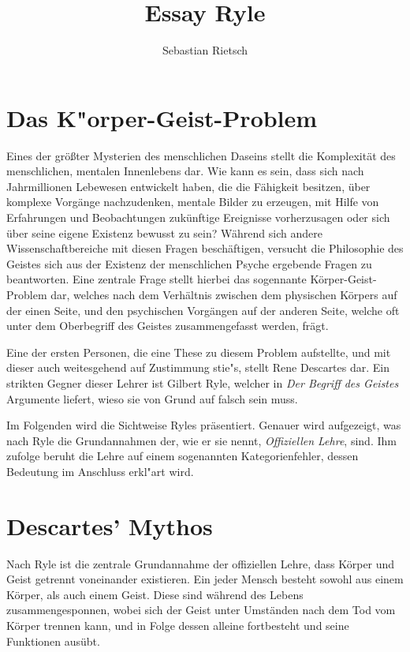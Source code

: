 \documentclass[a4paper]{article}
\title{Essay Ryle}
\date{}
\author{Sebastian Rietsch}
\begin{document}
\maketitle
\section{Das K"orper-Geist-Problem}
Eines der größter Mysterien des menschlichen Daseins stellt die Komplexität des menschlichen, mentalen Innenlebens dar. Wie kann es sein, dass sich nach Jahrmillionen Lebewesen entwickelt haben, die die Fähigkeit besitzen, über komplexe Vorgänge nachzudenken, mentale Bilder zu erzeugen, mit Hilfe von Erfahrungen und Beobachtungen zukünftige Ereignisse vorherzusagen oder sich über seine eigene Existenz bewusst zu sein? Während sich andere Wissenschaftbereiche mit diesen Fragen beschäftigen, versucht die Philosophie des Geistes sich aus der Existenz der menschlichen Psyche ergebende Fragen zu beantworten. Eine zentrale Frage stellt hierbei das sogennante Körper-Geist-Problem dar, welches nach dem Verhältnis zwischen dem physischen Körpers auf der einen Seite, und den psychischen Vorgängen auf der anderen Seite, welche oft unter dem Oberbegriff des Geistes zusammengefasst werden, frägt. 

Eine der ersten Personen, die eine These zu diesem Problem aufstellte, und mit dieser auch weitesgehend auf Zustimmung stie"s, stellt Rene Descartes dar. 
Ein strikten Gegner dieser Lehrer ist Gilbert Ryle, welcher in \textit{\glqq Der Begriff des Geistes\grqq{}} Argumente liefert, wieso sie von Grund auf falsch sein muss. 

Im Folgenden wird die Sichtweise Ryles präsentiert. Genauer wird aufgezeigt, was nach Ryle die Grundannahmen der, wie er sie nennt, \textit{\glqq Offiziellen Lehre\grqq{}}, sind. Ihm zufolge beruht die Lehre auf einem sogenannten Kategorienfehler, dessen Bedeutung im Anschluss erkl"art wird.

\section{Descartes' Mythos}
Nach Ryle ist die zentrale Grundannahme der offiziellen Lehre, dass Körper und Geist getrennt voneinander existieren. Ein jeder Mensch besteht sowohl aus einem Körper, als auch einem Geist. Diese sind während des Lebens zusammengesponnen, wobei sich der Geist unter Umständen nach dem Tod vom Körper trennen kann, und in Folge dessen alleine fortbesteht und seine Funktionen ausübt.  
\end{document}
